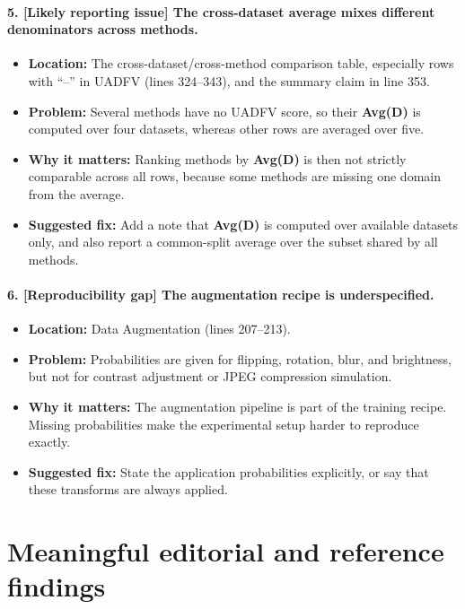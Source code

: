 \documentclass[11pt]{article}
\begin{document}
\paragraph{5. [Likely reporting issue] The cross-dataset average mixes different denominators across methods.}
\begin{itemize}
    \item \textbf{Location:} The cross-dataset/cross-method comparison table, especially rows with ``--'' in UADFV (lines 324--343), and the summary claim in line 353.
    \item \textbf{Problem:} Several methods have no UADFV score, so their \textbf{Avg(D)} is computed over four datasets, whereas other rows are averaged over five.
    \item \textbf{Why it matters:} Ranking methods by \textbf{Avg(D)} is then not strictly comparable across all rows, because some methods are missing one domain from the average.
    \item \textbf{Suggested fix:} Add a note that \textbf{Avg(D)} is computed over available datasets only, and also report a common-split average over the subset shared by all methods.
\end{itemize}

\paragraph{6. [Reproducibility gap] The augmentation recipe is underspecified.}
\begin{itemize}
    \item \textbf{Location:} Data Augmentation (lines 207--213).
    \item \textbf{Problem:} Probabilities are given for flipping, rotation, blur, and brightness, but not for contrast adjustment or JPEG compression simulation.
    \item \textbf{Why it matters:} The augmentation pipeline is part of the training recipe. Missing probabilities make the experimental setup harder to reproduce exactly.
    \item \textbf{Suggested fix:} State the application probabilities explicitly, or say that these transforms are always applied.
\end{itemize}

\section*{Meaningful editorial and reference findings}
\end{document}
